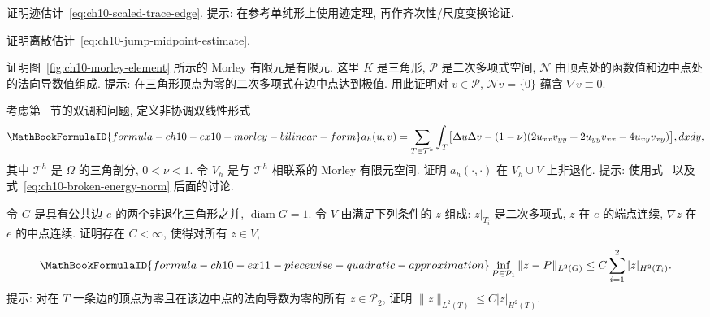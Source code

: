 \begin{MBExercise}
\label{exr:ch10-07}
证明迹估计~\eqref{eq:ch10-scaled-trace-edge}. 提示: 在参考单纯形上使用迹定理, 再作齐次性/尺度变换论证.
\end{MBExercise}

\begin{MBExercise}
\label{exr:ch10-08}
证明离散估计~\eqref{eq:ch10-jump-midpoint-estimate}.
\end{MBExercise}

\begin{MBExercise}
\label{exr:ch10-09}
证明图~\ref{fig:ch10-morley-element} 所示的 Morley 有限元是有限元. 这里 $K$ 是三角形, $\mathcal P$ 是二次多项式空间, $\mathcal N$ 由顶点处的函数值和边中点处的法向导数值组成. 提示: 在三角形顶点为零的二次多项式在边中点达到极值. 用此证明对 $v\in\mathcal P$, $\mathcal Nv=\{0\}$ 蕴含 $\nabla v\equiv0$.
\end{MBExercise}

\begin{MBExercise}
\label{exr:ch10-10}
考虑第~ 节的双调和问题, 定义非协调双线性形式
\[
\MathBookFormulaID{formula-ch10-ex10-morley-bilinear-form}
a_h(u,v)=\sum_{T\in\mathcal T^h}\int_T
\bigl[\Delta u\Delta v-(1-\nu)(2u_{xx}v_{yy}+2u_{yy}v_{xx}-4u_{xy}v_{xy})\bigr],dxdy,
\]
其中 $\mathcal T^h$ 是 $\Omega$ 的三角剖分, $0<\nu<1$. 令 $V_h$ 是与 $\mathcal T^h$ 相联系的 Morley 有限元空间. 证明 $a_h(\cdot,\cdot)$ 在 $V_h\cup V$ 上非退化. 提示: 使用式~ 以及式~\eqref{eq:ch10-broken-energy-norm} 后面的讨论.
\end{MBExercise}

\begin{MBExercise}
\label{exr:ch10-11}
令 $G$ 是具有公共边 $e$ 的两个非退化三角形之并, $\operatorname{diam}G=1$. 令 $V$ 由满足下列条件的 $z$ 组成: $z|_{T_i}$ 是二次多项式, $z$ 在 $e$ 的端点连续, $\nabla z$ 在 $e$ 的中点连续. 证明存在 $C<\infty$, 使得对所有 $z\in V$,
\[
\MathBookFormulaID{formula-ch10-ex11-piecewise-quadratic-approximation}
\inf_{P\in\mathcal P_1}\|z-P\|_{L^2(G)}
\leq C\sum_{i=1}^2|z|_{H^2(T_i)}.
\]
提示: 对在 $T$ 一条边的顶点为零且在该边中点的法向导数为零的所有 $z\in\mathcal P_2$, 证明 $\|z\|_{L^2(T)}\leq C|z|_{H^2(T)}$.
\end{MBExercise}

